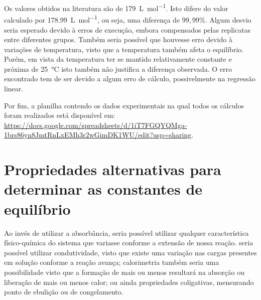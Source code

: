 \documentclass{article}
\begin{document}
Os valores obtidos na literatura são de \qty{179}{\liter\per\mol}. Isto difere do valor calculado por \qty{178,99}{\liter\per\mol}, ou seja, uma diferença de \(99,99\%\). Algum desvio seria esperado devido à erros de execução, embora compensados pelas replicatas entre diferentes grupos. Também seria possível que houvesse erro devido à variações de temperatura, visto que a temperatura também afeta o equilíbrio. Porém, em vista da temperatura ter se mantido relativamente constante e próxima de \qty{25}{\celsius} isto também não justifica a diferença observada. O erro encontrado tem de ser devido a algum erro de cálculo, possivelmente na regressão linear.

Por fim, a planilha contendo os dados experimentais na qual todos os cálculos foram realizados está disponível em: \url{https://docs.google.com/spreadsheets/d/1iT7FGQYQMga-1brs86yn8JmtRnLxEMh3r2wGimDK1WU/edit?usp=sharing}.

\section{Propriedades alternativas para determinar as constantes de equilíbrio}
Ao invés de utilizar a absorbância, seria possível utilizar qualquer característica físico-química do sistema que variasse conforme a extensão de nossa reação. seria possível utilizar condutividade, visto que existe uma variação nas cargas presentes em solução conforme a reação avança; calorimetria também seria uma possibilidade visto que a formação de mais ou menos  resultará na absorção ou liberação de mais ou menos calor; ou ainda propriedades coligativas, mensurando ponto de ebulição ou de congelamento.
    
    
\end{document}
